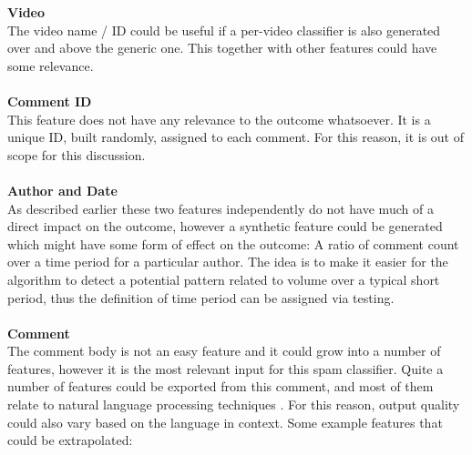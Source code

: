 \textbf{Video}
\\
The video name / ID could be useful if a per-video classifier is also generated over and above the generic one. This together with other features could have some relevance.
\\
\\
\textbf{Comment ID}
\\
This feature does not have any relevance to the outcome whatsoever. It is a unique ID, built randomly, assigned to each comment. For this reason, it is out of scope for this discussion.
\\
\\
\textbf{Author and Date}
\\
As described earlier these two features independently do not have much of a direct impact on the outcome, however a synthetic feature could be generated which might have some form of effect on the outcome: A ratio of comment count over a time period for a particular author.
The idea is to make it easier for the algorithm to detect a potential pattern related to volume over a typical short period, thus the definition of time period can be assigned via testing.
\\
\\
\textbf{Comment}
\\
The comment body is not an easy feature and it could grow into a number of features, however it is the most relevant input for this spam classifier.
Quite a number of features could be exported from this comment, and most of them relate to natural language processing techniques \citep{CormackSMSFilter}. For this reason, output quality could also vary based on the language in context.
Some example features that could be extrapolated:

